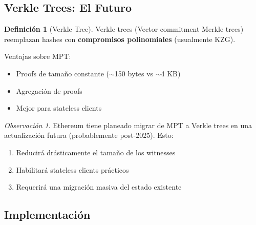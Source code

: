 \documentclass[11pt,a4paper,twoside,openright]{book}
\theoremstyle{definition}
\newtheorem{definition}{Definición}[chapter]
\theoremstyle{plain}
\theoremstyle{remark}
\newtheorem{remark}{Observación}[chapter]
\begin{document}
\subsection{Verkle Trees: El Futuro}

\begin{definition}[Verkle Tree]
Verkle trees (Vector commitment Merkle trees) reemplazan hashes con \textbf{compromisos polinomiales} (usualmente KZG).

Ventajas sobre MPT:
\begin{itemize}
    \item Proofs de tamaño constante ($\sim$150 bytes vs $\sim$4 KB)
    \item Agregación de proofs
    \item Mejor para stateless clients
\end{itemize}
\end{definition}

\begin{remark}
Ethereum tiene planeado migrar de MPT a Verkle trees en una actualización futura (probablemente post-2025). Esto:
\begin{enumerate}
    \item Reducirá drásticamente el tamaño de los witnesses
    \item Habilitará stateless clients prácticos
    \item Requerirá una migración masiva del estado existente
\end{enumerate}
\end{remark}

\subsection{Implementación}
\end{document}
